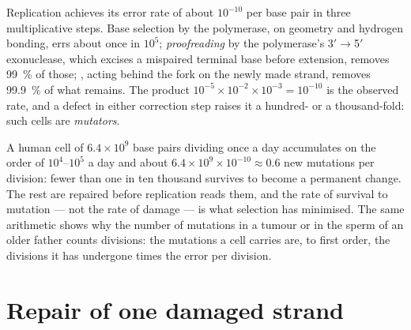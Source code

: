\begin{proposition}\label{prop:b3:dna-repair:fidelity}
Replication achieves its error rate of about $10^{-10}$ per base pair
in three multiplicative steps. Base selection by the polymerase, on
geometry and hydrogen bonding, errs about once in $10^{5}$;
\emph{proofreading} by the polymerase's 3$'\to$5$'$ exonuclease, which
excises a mispaired terminal base before extension, removes
\qty{99}{\%} of those; \emph{}, acting behind the fork
on the newly made strand, removes \qty{99.9}{\%} of what remains. The
product $10^{-5}\times 10^{-2}\times 10^{-3} = 10^{-10}$ is the
observed rate, and a defect in either correction step raises it a
hundred- or a thousand-fold: such cells are \emph{mutators}.
\end{proposition}

\begin{example}\label{ex:b3:dna-repair:numbers}
A human cell of $6.4\times 10^{9}$ base pairs dividing once a day
accumulates on the order of $10^{4}$--$10^{5}$  a day and
about $6.4\times 10^{9}\times 10^{-10} \approx 0.6$ new mutations per
division: fewer than one  in ten thousand survives to become a
permanent change. The rest are repaired before replication reads
them, and the rate of survival to mutation --- not the rate of damage
--- is what selection has minimised. The same arithmetic shows why the
number of mutations in a tumour or in the sperm of an older father
counts divisions: the mutations a cell carries are, to first order,
the divisions it has undergone times the error per division.
\end{example}

\section{Repair of one damaged strand}

